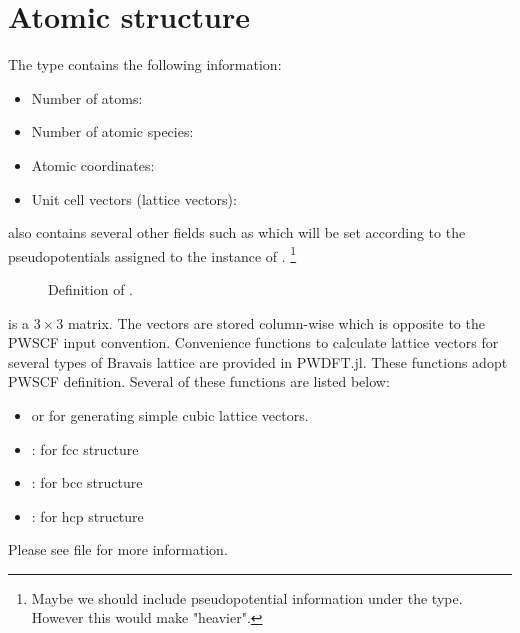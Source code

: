 \section{Atomic structure}
%
The type  contains the following information:
%
\begin{itemize}
\item Number of atoms: 
\item Number of atomic species: 
\item Atomic coordinates: 
\item Unit cell vectors (lattice vectors): 
\end{itemize}
%
 also contains several other fields such as 
which will be set according to the pseudopotentials assigned to
the instance of .
\footnote{Maybe we should include pseudopotential information under the
 type. However this would make  "heavier".}

\begin{figure}[H]
\centering
{}
\caption{Definition of .}
\end{figure}


 is a $3\times3$ matrix. The vectors are stored column-wise which is
opposite to the PWSCF input convention.
Convenience functions to calculate lattice vectors for several types of Bravais lattice
are provided in \textsf{PWDFT.jl}. These functions adopt PWSCF definition. Several
of these functions are listed below:
\begin{itemize}
\item {} or  for generating
simple cubic lattice vectors.
\item {}: for fcc structure
\item {}: for bcc structure
\item {}: for hcp structure
\end{itemize}
Please see file  for more information.


